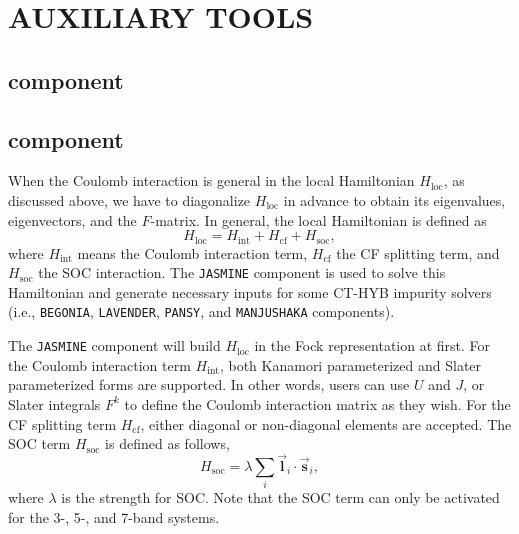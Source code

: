 \chapter{AUXILIARY TOOLS}
\section{{\daisy} component}
\section{{\jasmine} component}
When the Coulomb interaction is general in the local Hamiltonian $H_{\text{loc}}$, as discussed above, we have to diagonalize $H_{\text{loc}}$ in advance to obtain its eigenvalues, eigenvectors, and the $F$-matrix. In general, the local Hamiltonian is defined as
\begin{equation}
H_{\text{loc}} = H_{\text{int}} + H_{\text{cf}} + H_{\text{soc}},
\end{equation}
where $H_{\text{int}}$ means the Coulomb interaction term, $H_{\text{cf}}$ the CF splitting term, and $H_{\text{soc}}$ the SOC interaction. The \texttt{JASMINE} component is used to solve this Hamiltonian and generate necessary inputs for some CT-HYB impurity solvers (i.e., \texttt{BEGONIA}, \texttt{LAVENDER}, \texttt{PANSY}, and \texttt{MANJUSHAKA} components).

The \texttt{JASMINE} component will build $H_{\text{loc}}$ in the Fock representation at first. For the Coulomb interaction term $H_{\text{int}}$, both Kanamori parameterized and Slater parameterized forms are supported. In other words, users can use $U$ and $J$, or Slater integrals $F^{k}$ to define the Coulomb interaction matrix as they wish. For the CF splitting term $H_{\text{cf}}$, either diagonal or non-diagonal elements are accepted. The SOC term $H_{\text{soc}}$ is defined as follows,
\begin{equation}
H_{\text{soc}} = \lambda \sum_i \vec{\mathbf{l}}_i \cdot \vec{\mathbf{s}}_i,
\end{equation}
where $\lambda$ is the strength for SOC. Note that the SOC term can only be activated for the 3-, 5-, and 7-band systems.

